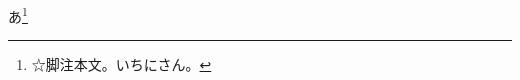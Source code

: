 \documentclass[pdflatex,tate,paper=a5]{jlreq}
\begin{document}
あ\footnote{☆脚注本文。いちにさん。}%
\end{document}
